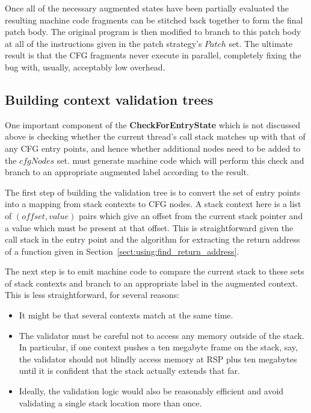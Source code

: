 Once all of the necessary augmented states have been partially
evaluated the resulting machine code fragments can be stitched back
together to form the final patch body.  The original program is then
modified to branch to this patch body at all of the instructions given
in the patch strategy's $Patch$ set.  The ultimate result is that the
CFG fragments never execute in parallel, completely fixing the bug
with, usually, acceptably low overhead.




\subsection{Building context validation trees}

One important component of the \textbf{CheckForEntryState} which is
not discussed above is checking whether the current thread's call
stack matches up with that of any CFG entry points, and hence whether
additional nodes need to be added to the $\mathit{cfgNodes}$ set.
{\Technique} must generate machine code which will perform this check
and branch to an appropriate augmented label according to the result.

The first step of building the validation tree is to convert the set
of entry points into a mapping from stack contexts to CFG nodes.  A
stack context here is a list of $(offset, value)$ pairs which give an
offset from the current stack pointer and a value which must be
present at that offset.  This is straightforward given the call stack
in the entry point and the algorithm for extracting the return address
of a function given in Section~\ref{sect:using:find_return_address}.

The next step is to emit machine code to compare the current stack to
these sets of stack contexts and branch to an appropriate label in the
augmented context.  This is less straightforward, for several reasons:

\begin{itemize}
\item
  It might be that several contexts match at the same time.
\item
  The validator must be careful not to access any memory outside of
  the stack.  In particular, if one context pushes a ten megabyte
  frame on the stack, say, the validator should not blindly access
  memory at RSP plus ten megabytes until it is confident that the
  stack actually extends that far.
\item
  Ideally, the validation logic would also be reasonably efficient and
  avoid validating a single stack location more than once.
\end{itemize}


